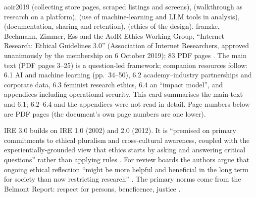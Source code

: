 \begin{papercard}{aoir2019}
  (collecting store pages, scraped listings and screens),  (walkthrough as research on a platform),  (use of machine-learning and LLM tools in analysis),  (documentation, sharing and retention),  (ethics of the design). franzke, Bechmann, Zimmer, Ess and the AoIR Ethics Working Group, ``Internet Research: Ethical Guidelines 3.0'' (Association of Internet Researchers, approved unanimously by the membership on 6 October 2019); 83 PDF pages . The main text (PDF pages 3--25) is a question-led framework; companion resources follow: 6.1 AI and machine learning (pp.\ 34--50), 6.2 academy--industry partnerships and corporate data, 6.3 feminist research ethics, 6.4 an ``impact model'', and appendices including operational security. This card summarises the main text and 6.1; 6.2--6.4 and the appendices were not read in detail. Page numbers below are PDF pages (the document's own page numbers are one lower).

 IRE 3.0 builds on IRE 1.0 (2002) and 2.0 (2012). It is ``premised on primary commitments to ethical pluralism and cross-cultural awareness, coupled with the experientially-grounded view that ethics starts by asking and answering critical questions'' rather than applying rules . For review boards the authors argue that ongoing ethical reflection ``might be more helpful and beneficial in the long term for society than now restricting research'' . The primary norms come from the Belmont Report: respect for persons, beneficence, justice .


\end{papercard}
